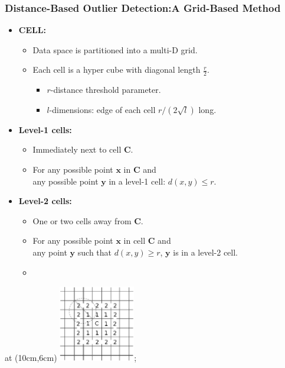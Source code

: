 \begin{frame}
	\frametitle{Distance-Based Outlier Detection:A Grid-Based Method}
	\begin{itemize}
		\item \textbf{CELL:}
		      \begin{itemize}
			      \item Data space is partitioned into a multi-D grid.
			      \item Each cell is a hyper cube with diagonal length $\frac{r}{2}$.
			            \begin{itemize}
				            \item $r$-distance threshold parameter.
				            \item $l$-dimensions: edge of each cell $r / (2\sqrt{l})$ long.
			            \end{itemize}
		      \end{itemize}
		\item \textbf{Level-1 cells:}
		      \begin{itemize}
			      \item Immediately next to cell $\mathbf{C}$.
			      \item For any possible point $\mathbf{x}$ in $\mathbf{C}$ and \\
			            any possible point $\mathbf{y}$ in a level-1 cell: $d(x,y) \leq r$.
		      \end{itemize}
		\item \textbf{Level-2 cells:}
		      \begin{itemize}
			      \item One or two cells away from $\mathbf{C}$.
			      \item For any possible point $\mathbf{x}$ in cell $\mathbf{C}$ and \\
			            any point $\mathbf{y}$ such that $d(x,y) \geq r$, $\mathbf{y}$ is in a level-2 cell.
			      \item
		      \end{itemize}
	\end{itemize}
	\tikzoverlay at (10cm,6cm) {\includegraphics[width=0.25\textwidth]{img/grid8.png}};
\end{frame}


